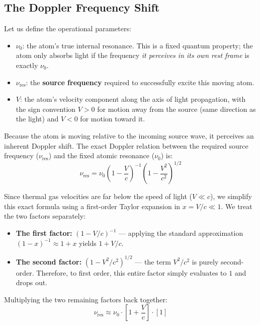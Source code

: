 \subsection{The Doppler Frequency Shift}

Let us define the operational parameters:
\begin{itemize}
    \item $\nu_0$: the atom's true internal resonance. This is a fixed quantum property; the atom only absorbs light if the frequency \emph{it perceives in its own rest frame} is exactly $\nu_0$.
    \item $\nu_{\text{res}}$: the \textbf{source frequency} required to successfully excite this moving atom.
    \item $V$: the atom's velocity component along the axis of light propagation, with the sign convention $V > 0$ for motion away from the source (same direction as the light) and $V < 0$ for motion toward it.
\end{itemize}

Because the atom is moving relative to the incoming source wave, it perceives an inherent Doppler shift. The exact Doppler relation between the required source frequency ($\nu_{\text{res}}$) and the fixed atomic resonance ($\nu_0$) is:
\begin{equation*}
    \nu_{\text{res}} = \nu_0 \left(1 - \frac{V}{c}\right)^{-1}\!\left(1 - \frac{V^2}{c^2}\right)^{1/2}
\end{equation*}

Since thermal gas velocities are far below the speed of light ($V \ll c$), we simplify this exact formula using a first-order Taylor expansion in $x = V/c \ll 1$. We treat the two factors separately:
\begin{itemize}
    \item \textbf{The first factor:} $\left(1 - V/c\right)^{-1}$ — applying the standard approximation $(1-x)^{-1} \approx 1 + x$ yields $1 + V/c$.
    \item \textbf{The second factor:} $\left(1 - V^2/c^2\right)^{1/2}$ — the term $V^2/c^2$ is purely second-order. Therefore, to first order, this entire factor simply evaluates to $1$ and drops out.
\end{itemize}

Multiplying the two remaining factors back together:
\begin{equation*}
    \nu_{\text{res}} \approx \nu_0 \cdot \left[1 + \frac{V}{c}\right] \cdot [1]
\end{equation*}

